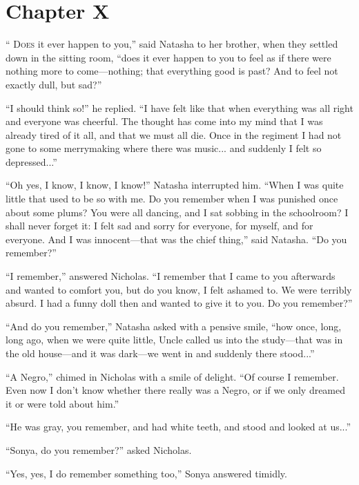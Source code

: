 \chapter*{Chapter X}
\ifaudio     
{} 
\fi

\lettrine[lines=2, loversize=0.3, lraise=0]{`` \initfamily D}{oes}
it ever happen to you,'' said Natasha to her brother, when
they settled down in the sitting room, ``does it ever happen to
you to feel as if there were nothing more to come---nothing; that
everything good is past? And to feel not exactly dull, but sad?''

``I should think so!'' he replied. ``I have felt like that when
everything was all right and everyone was cheerful. The thought
has come into my mind that I was already tired of it all, and
that we must all die. Once in the regiment I had not gone to some
merrymaking where there was music... and suddenly I felt so
depressed...''

``Oh yes, I know, I know, I know!'' Natasha interrupted
him. ``When I was quite little that used to be so with me. Do you
remember when I was punished once about some plums? You were all
dancing, and I sat sobbing in the schoolroom? I shall never
forget it: I felt sad and sorry for everyone, for myself, and for
everyone. And I was innocent---that was the chief thing,'' said
Natasha. ``Do you remember?''

``I remember,'' answered Nicholas. ``I remember that I came to
you afterwards and wanted to comfort you, but do you know, I felt
ashamed to. We were terribly absurd. I had a funny doll then and
wanted to give it to you. Do you remember?''

``And do you remember,'' Natasha asked with a pensive smile,
``how once, long, long ago, when we were quite little, Uncle
called us into the study---that was in the old house---and it was
dark---we went in and suddenly there stood...''

``A Negro,'' chimed in Nicholas with a smile of delight. ``Of
course I remember. Even now I don't know whether there really was
a Negro, or if we only dreamed it or were told about him.''

``He was gray, you remember, and had white teeth, and stood and
looked at us...''

``Sonya, do you remember?'' asked Nicholas.

``Yes, yes, I do remember something too,'' Sonya answered
timidly.

